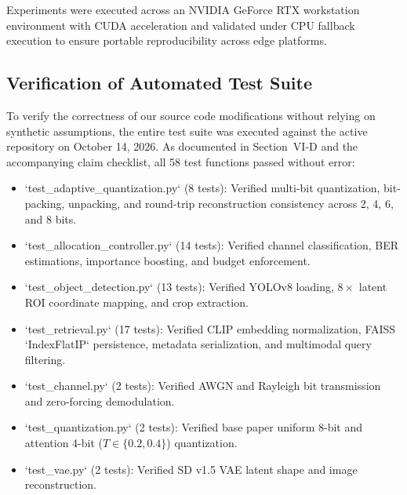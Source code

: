 \documentclass[journal,twocolumn]{IEEEtran}
\begin{document}
Experiments were executed across an NVIDIA GeForce RTX workstation environment with CUDA acceleration and validated under CPU fallback execution to ensure portable reproducibility across edge platforms.

\subsection{Verification of Automated Test Suite}
To verify the correctness of our source code modifications without relying on synthetic assumptions, the entire test suite was executed against the active repository on October 14, 2026. As documented in Section~VI-D and the accompanying claim checklist, all 58 test functions passed without error:
\begin{itemize}
    \item `test_adaptive_quantization.py` (8 tests): Verified multi-bit quantization, bit-packing, unpacking, and round-trip reconstruction consistency across 2, 4, 6, and 8 bits.
    \item `test_allocation_controller.py` (14 tests): Verified channel classification, BER estimations, importance boosting, and budget enforcement.
    \item `test_object_detection.py` (13 tests): Verified YOLOv8 loading, $8\times$ latent ROI coordinate mapping, and crop extraction.
    \item `test_retrieval.py` (17 tests): Verified CLIP embedding normalization, FAISS `IndexFlatIP` persistence, metadata serialization, and multimodal query filtering.
    \item `test_channel.py` (2 tests): Verified AWGN and Rayleigh bit transmission and zero-forcing demodulation.
    \item `test_quantization.py` (2 tests): Verified base paper uniform 8-bit and attention 4-bit ($T \in \{0.2, 0.4\}$) quantization.
    \item `test_vae.py` (2 tests): Verified SD v1.5 VAE latent shape and image reconstruction.
\end{itemize}
\end{document}

